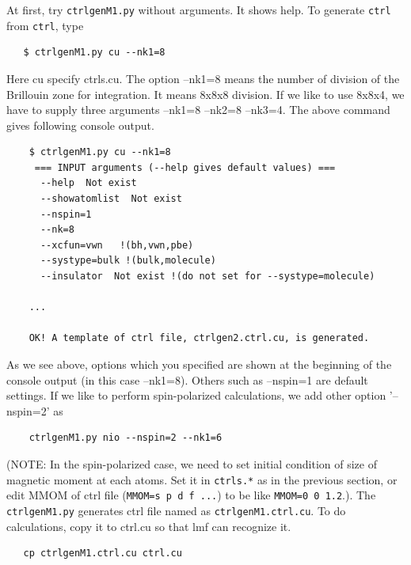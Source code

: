 \documentclass[a4paper,10pt,epsf,fleqn]{article}
\begin{document}
At first, try \verb+ctrlgenM1.py+ without arguments. It shows help. 
To generate \verb+ctrl+ from \verb+ctrl+, type
\begin{verbatim}
   $ ctrlgenM1.py cu --nk1=8
\end{verbatim}
Here cu specify ctrls.cu. The option --nk1=8 
means the number of division of the Brillouin zone for
integration. It means 8x8x8 division. If we like to use 8x8x4, 
we have to supply three arguments --nk1=8 --nk2=8 --nk3=4.
The above command gives following console output.
\begin{verbatim}
    $ ctrlgenM1.py cu --nk1=8
     === INPUT arguments (--help gives default values) === 
      --help  Not exist
      --showatomlist  Not exist
      --nspin=1
      --nk=8
      --xcfun=vwn   !(bh,vwn,pbe) 
      --systype=bulk !(bulk,molecule)
      --insulator  Not exist !(do not set for --systype=molecule)

    ...

    OK! A template of ctrl file, ctrlgen2.ctrl.cu, is generated.
\end{verbatim}
As we see above, 
options which you specified are shown at the beginning of the console output
(in this case --nk1=8). Others such as --nspin=1 are default settings.
If we like to perform spin-polarized calculations, we add other option
'--nspin=2' as
\begin{verbatim}
    ctrlgenM1.py nio --nspin=2 --nk1=6
\end{verbatim}
(NOTE: In the spin-polarized case, we need to set initial condition of size of
magnetic moment at each atoms. Set it in \verb+ctrls.*+ as in the
previous section, or edit MMOM of ctrl file (\verb+MMOM=s p d f ...+) to be like
\verb+MMOM=0 0 1.2+.). The \verb+ctrlgenM1.py+ generates ctrl file named as
\verb+ctrlgenM1.ctrl.cu+. To do calculations, copy it to ctrl.cu so 
that lmf can recognize it.
\begin{verbatim}
   cp ctrlgenM1.ctrl.cu ctrl.cu
\end{verbatim}
\end{document}
